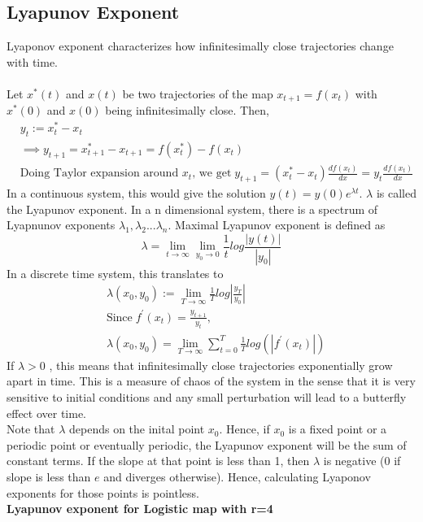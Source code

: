 \documentclass[11pt]{article}
\begin{document}
         \subsection{Lyapunov Exponent}
            Lyaponov exponent characterizes how infinitesimally close trajectories change with time. \\ \\
            Let $x^*(t)$ and $x(t)$ be two trajectories of the map $x_{t+1} = f(x_t)$ with $x^*(0)$ and $x(0)$ being infinitesimally close. Then,
            \begin{align*}
            &y_t := x^*_t - x_t\\
            &\implies y_{t+1} = x^*_{t+1} - x_{t+1} = f(x^*_t) - f(x_t)\\
            &\textrm{Doing Taylor expansion around $x_t$, we get} \; y_{t+1} = (x^*_t - x_t) \frac{df(x_t)}{dx} = y_t  \frac{df(x_t)}{dx}
            \end{align*}
            In a continuous system, this would give the solution $y(t) = y(0) e^{\lambda t}$. $\lambda$ is called the Lyapunov exponent. In a n dimensional system, there is a spectrum of Lyapnunov exponents $\lambda_1, \lambda_2 ... \lambda_n$. Maximal Lyapunov exponent is defined as 
            $$
            \lambda = \lim_{t \to \infty} \lim_{y_0 \to 0} \frac{1}{t} log\frac{|y(t)|}{|y_0|}
            $$
            In a discrete time system, this translates to
            \begin{align*}
               &\lambda(x_0,y_0) := \lim_{T\to\infty} \frac{1}{T} log |\frac{y_T}{y_0}|\\
               & \textrm{Since} \; f^{'}(x_t) = \frac{y_{t+1}}{y_t}, \\
               &\lambda(x_0,y_0) = \lim_{T\to\infty} \sum_{t=0}^{T} \frac{1}{T} log(|f^{'}(x_t)|)
            \end{align*}
            If $\lambda > 0$ , this means that infinitesimally close trajectories exponentially grow apart in time. This is a measure of chaos of the system in the sense that it is very sensitive to initial conditions and any small perturbation will lead to a butterfly effect over time. \\
            Note that $\lambda$ depends on the inital point $x_0$. Hence, if $x_0$ is a fixed point or a periodic point or eventually periodic, the Lyapunov exponent will be the sum of constant terms. If the slope at that point is less than 1, then $\lambda$ is negative (0 if slope is less than $e$ and diverges otherwise). Hence, calculating Lyaponov exponents for those points is pointless. \\[5mm]   \newpage       
            \textbf{Lyapunov exponent for Logistic map with r=4}
\end{document}
